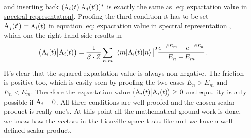 %
and inserting back $({\mathrm{A}_{i}(t)}|{\mathrm{A}_{j}(t')})^{*}$ is exactly the same as \eqref{eq: expactation value in spectral representation}.
Proofing the third condition it has to be set $\mathrm{A}_{j}(t') = \mathrm{A}_{i}(t)$ in equation \eqref{eq: expactation value in spectral representation}, which one the right hand side results in 
%
\begin{align}
	\obraket{\mt{A}_{i}(t)}{\mt{A}_{i}(t)} &= \frac{1}{\beta \cdot Z} \sum\limits_{n,m} \big\vert\mel{m}{\mt{A}_{i}(t)}{n}\big\vert^{2} \frac{e^{-\beta E_{m}} - e^{-\beta E_{n}}}{E_{n}-E_{m}}.
\end{align}
%
It's clear that the squared expactation value is always non-negative.
The friction is positive too, which is easily seen by proofing the two cases $E_{n} > E_{m}$ and $E_{n} < E_{m}$.
Therefore the expactation value $\big({\mathrm{A}_{i}(t)}\big|{\mathrm{A}_{i}(t)}\big) \geq 0$ and equallity is only possible if $\mathrm{A}_{i} = 0$.
All three conditions are well proofed and the chosen scalar product is really one's.
At this point all the mathematical ground work is done, we know how the vectors in the Liouville space looks like and we have a well defined scalar product.

